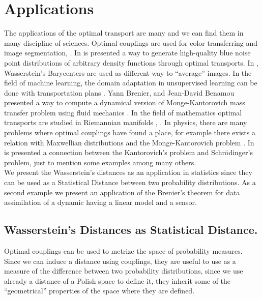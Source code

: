 \chapter{Applications}

The applications of the optimal transport are many and we can find them in many discipline of sciences. Optimal couplings are used for color transferring and image segmentation, \cite{Papadakis2015OTImageProcessing}. In \cite{deGoes:2012:BNOT} is presented a way to generate high-quality blue
noise point distributions of arbitrary density functions through optimal transports. In \cite{Peyre2012TextureMixing}, Wasserstein's Barycenters are used as different way to ``average'' images. In the field of machine learning, the domain adaptation in unsupervised learning can be done with transportation plans \cite{Courty2017OTDA}. Yann Brenier, and Jean-David Benamou presented a way to compute a dynamical version of Monge-Kantorovich mass transfer problem using fluid mechanics \cite{Brenier2000Fluidmechanics}. In the field of mathematics optimal transports are studied in Riemannian manifolds \cite{Villani2008OT}, \cite{Figalli@2011}. In physics, there are many problems where optimal couplings have found a place, for example there exists a relation with Maxwellian distributions and the Monge-Kantorovich problem \cite{Tanaka1978Maxwell}. In \cite{Leonard2012Schrodinger} is presented a connection between the Kantorovich's problem and Schr\"odinger's problem, just to mention some examples among many others. \\



We present the Wasserstein's distances as an application in statistics since they can be used as a Statistical Distance between two probability distributions. As a second example we present an application of the Brenier's theorem for data assimilation of a dynamic having a linear model and a sensor. 
\section{Wasserstein's Distances as Statistical Distance.}
Optimal couplings can be used to metrize the space of probability measures. Since we can induce a distance using couplings, they are useful to use as a measure of the difference between two probability distributions, since we use already a distance of a Polish space to define it, they inherit some of the ``geometrical'' properties of the space where they are defined.  

